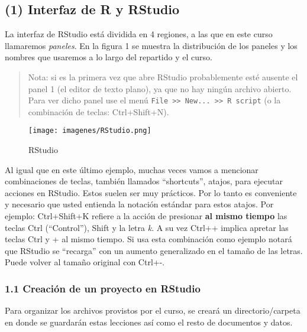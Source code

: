 \documentclass[]{article}
\makeatletter
\def\maxwidth{\ifdim\Gin@nat@width>\linewidth\linewidth
\else\Gin@nat@width\fi}
\let\Oldincludegraphics\includegraphics
\renewcommand{\includegraphics}[1]{\Oldincludegraphics[width=\maxwidth]{#1}}
\makeatother
\begin{document}
\subsection{(1) Interfaz de R y RStudio}

La interfaz de RStudio está dividida en 4 regiones, a las que en este
curso llamaremos \emph{paneles}. En la figura 1 se muestra la
distribución de los paneles y los nombres que usaremos a lo largo del
repartido y el curso.

\begin{quote}
Nota: si es la primera vez que abre RStudio probablemente esté ausente
el panel 1 (el editor de texto plano), ya que no hay ningún archivo
abierto. Para ver dicho panel use el menú
\texttt{File \textgreater{}\textgreater{} New... \textgreater{}\textgreater{} R script}
(o la combinación de teclas: Ctrl+Shift+N).

\end{quote}
\begin{figure}[htbp]
\centering
\texttt{[image: imagenes/RStudio.png]}
\caption{RStudio}
\end{figure}

Al igual que en este último ejemplo, muchas veces vamos a mencionar
combinaciones de teclas, también llamados ``shortcuts'', atajos, para
ejecutar acciones en RStudio. Estos suelen ser muy prácticos. Por lo
tanto es conveniente y necesario que usted entienda la notación estándar
para estos atajos. Por ejemplo: Ctrl+Shift+K refiere a la acción de
presionar \textbf{al mismo tiempo} las teclas Ctrl (``Control''), Shift
y la letra \emph{k}. A su vez Ctrl++ implica apretar las teclas Ctrl y +
al mismo tiempo. Si usa esta combinación como ejemplo notará que RStudio
se ``recarga'' con un aumento generalizado en el tamaño de las letras.
Puede volver al tamaño original con Ctrl+-.

\subsubsection{1.1 Creación de un proyecto en RStudio}

Para organizar los archivos provistos por el curso, se creará un
directorio/carpeta en donde se guardarán estas lecciones así como el
resto de documentos y datos.
\end{document}
